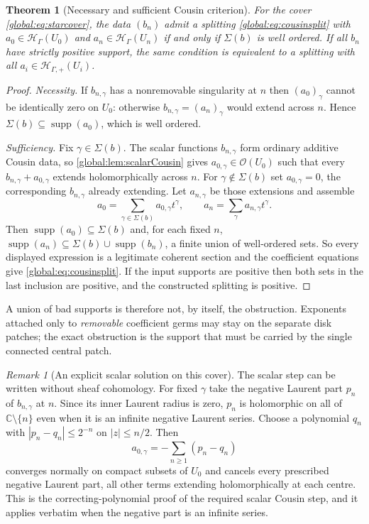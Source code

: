 \documentclass[11pt,letterpaper]{article}
\newtheorem{theorem}{Theorem}[section]
\theoremstyle{definition}
\theoremstyle{remark}
\newtheorem{remark}[remark]{Remark}
\newcommand{\C}{\mathbb C}
\newcommand{\OO}{\mathcal O}
\newcommand{\HH}{\mathscr H_\Gamma}
\newcommand{\HP}{\mathscr H_{\Gamma,+}}
\newcommand{\supp}{\operatorname{supp}}
\newcommand{\abs}[1]{\left|#1\right|}
\numberwithin{equation}{section}
\begin{document}
\begin{theorem}[Necessary and sufficient Cousin criterion]\label{global:thm:cousincriterion}
For the cover \eqref{global:eq:starcover}, the data $(b_n)$ admit a splitting \eqref{global:eq:cousinsplit} with $a_0\in\HH(U_0)$ and $a_n\in\HH(U_n)$ if and only if $\Sigma(b)$ is well ordered. If all $b_n$ have strictly positive support, the same condition is equivalent to a splitting with all $a_i\in\HP(U_i)$.
\end{theorem}

\begin{proof}
\emph{Necessity.} If $b_{n,\gamma}$ has a nonremovable singularity at $n$ then $(a_0)_\gamma$ cannot be identically zero on $U_0$: otherwise $b_{n,\gamma}=(a_n)_\gamma$ would extend across $n$. Hence $\Sigma(b)\subseteq\supp(a_0)$, which is well ordered.

\emph{Sufficiency.} Fix $\gamma\in\Sigma(b)$. The scalar functions $b_{n,\gamma}$ form ordinary additive Cousin data, so \cref{global:lem:scalarCousin} gives $a_{0,\gamma}\in\OO(U_0)$ such that every $b_{n,\gamma}+a_{0,\gamma}$ extends holomorphically across $n$. For $\gamma\notin\Sigma(b)$ set $a_{0,\gamma}=0$, the corresponding $b_{n,\gamma}$ already extending. Let $a_{n,\gamma}$ be those extensions and assemble
\[
  a_0=\sum_{\gamma\in\Sigma(b)}a_{0,\gamma}t^\gamma,
  \qquad a_n=\sum_\gamma a_{n,\gamma}t^\gamma .
\]
Then $\supp(a_0)\subseteq\Sigma(b)$ and, for each fixed $n$, $\supp(a_n)\subseteq\Sigma(b)\cup\supp(b_n)$, a finite union of well-ordered sets. So every displayed expression is a legitimate coherent section and the coefficient equations give \eqref{global:eq:cousinsplit}. If the input supports are positive then both sets in the last inclusion are positive, and the constructed splitting is positive.
\end{proof}

A union of bad supports is therefore not, by itself, the obstruction. Exponents attached only to \emph{removable} coefficient germs may stay on the separate disk patches; the exact obstruction is the support that must be carried by the single connected central patch.

\begin{remark}[An explicit scalar solution on this cover]\label{global:rem:explicitCousin}
The scalar step can be written without sheaf cohomology. For fixed $\gamma$ take the negative Laurent part $p_n$ of $b_{n,\gamma}$ at $n$. Since its inner Laurent radius is zero, $p_n$ is holomorphic on all of $\C\setminus\{n\}$ even when it is an infinite negative Laurent series. Choose a polynomial $q_n$ with $\abs{p_n-q_n}\le2^{-n}$ on $\abs z\le n/2$. Then
\[
  a_{0,\gamma}=-\sum_{n\ge1}(p_n-q_n)
\]
converges normally on compact subsets of $U_0$ and cancels every prescribed negative Laurent part, all other terms extending holomorphically at each centre. This is the correcting-polynomial proof of the required scalar Cousin step, and it applies verbatim when the negative part is an infinite series.
\end{remark}
\end{document}
